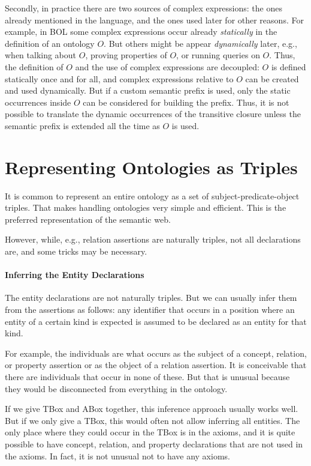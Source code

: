 Secondly, in practice there are two sources of complex expressions: the ones already mentioned in the language, and the ones used later for other reasons.
For example, in BOL some complex expressions occur already \emph{statically} in the definition of an ontology $O$.
But others might be appear \emph{dynamically} later, e.g., when talking about $O$, proving properties of $O$, or running queries on $O$.
Thus, the definition of $O$ and the use of complex expressions are decoupled: $O$ is defined statically once and for all, and complex expressions relative to $O$ can be created and used dynamically.
But if a custom semantic prefix is used, only the static occurrences inside $O$ can be considered for building the prefix.
Thus, it is not possible to translate the dynamic occurrences of the transitive closure unless the semantic prefix is extended all the time as $O$ is used.

\section{Representing Ontologies as Triples}

It is common to represent an entire ontology as a set of subject-predicate-object triples.
That makes handling ontologies very simple and efficient.
This is the preferred representation of the semantic web.

However, while, e.g., relation assertions are naturally triples, not all declarations are, and some tricks may be necessary.

\paragraph{Inferring the Entity Declarations}
The entity declarations are not naturally triples.
But we can usually infer them from the assertions as follows: any identifier that occurs in a position where an entity of a certain kind is expected is assumed to be declared as an entity for that kind.

For example, the individuals are what occurs as the subject of a concept, relation, or property assertion or as the object of a relation assertion.
It is conceivable that there are individuals that occur in none of these.
But that is unusual because they would be disconnected from everything in the ontology.

If we give TBox and ABox together, this inference approach usually works well.
But if we only give a TBox, this would often not allow inferring all entities.
The only place where they could occur in the TBox is in the axioms, and it is quite possible to have concept, relation, and property declarations that are not used in the axioms.
In fact, it is not unusual not to have any axioms.

